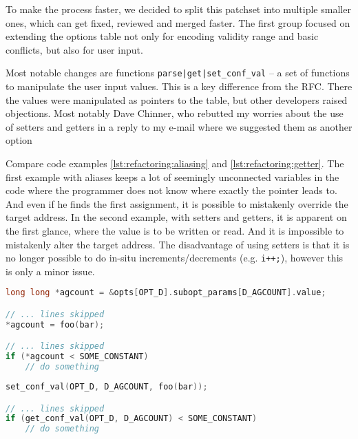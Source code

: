 \begin{desciption}
To make the process faster, we decided to split this patchset into multiple
smaller ones, which can get fixed, reviewed and merged faster. The first
group focused on extending the options table not only for encoding validity
range and basic conflicts, but also for user input.

Most notable changes are functions {\tt parse|get|set\_conf\_val}
-- a set of functions to manipulate the user input values. This is a key
difference from the RFC. There the values were manipulated as pointers to the
table, but other developers raised objections. Most notably Dave Chinner, who
rebutted my worries about the use of setters and getters in a reply to my
e-mail where we suggested them as another option~\cite{unifyTypes1, unifyTypes2}

Compare code examples \ref{lst:refactoring:aliasing} and
\ref{lst:refactoring:getter}.  The first example with aliases keeps a lot of
seemingly unconnected variables in the code where the programmer does not know
where exactly the pointer leads to. And even if he finds the first assignment,
it is possible to mistakenly override the target address. In the second
example, with setters and getters, it is apparent on the first glance, where
the value is to be written or read. And it is impossible to mistakenly alter
the target address. The disadvantage of using setters is that it is no longer possible to do in-situ increments/decrements (e.g. {\tt i++;}), however this is only a minor issue.

\begin{lstlisting}[frame=none, basicstyle=\footnotesize\ttfamily,
language=C, numbers=none, numberstyle=\tiny\color{black},
label={lst:refactoring:aliasing},
caption={Pointer aliases in RFC of the second set.}]
long long *agcount = &opts[OPT_D].subopt_params[D_AGCOUNT].value;

// ... lines skipped
*agcount = foo(bar);

// ... lines skipped
if (*agcount < SOME_CONSTANT)
	// do something
\end{lstlisting}

\begin{lstlisting}[frame=none, basicstyle=\footnotesize\ttfamily,
language=C, numbers=none, numberstyle=\tiny\color{black},
label={lst:refactoring:getter},
caption={Setters and getters in later version of the second set.}]
set_conf_val(OPT_D, D_AGCOUNT, foo(bar));

// ... lines skipped
if (get_conf_val(OPT_D, D_AGCOUNT) < SOME_CONSTANT)
	// do something
\end{lstlisting}


\end{desciption}
